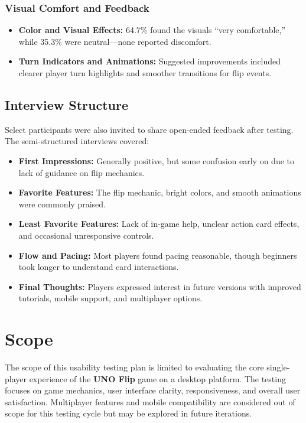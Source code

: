 \documentclass[12pt, titlepage]{article}
\begin{document}
\subsubsection{Visual Comfort and Feedback}
\begin{itemize}
    \item \textbf{Color and Visual Effects:} 64.7\% found the visuals “very comfortable,” while 35.3\% were neutral—none reported discomfort.
    \item \textbf{Turn Indicators and Animations:} Suggested improvements included clearer player turn highlights and smoother transitions for flip events.
\end{itemize}

\subsection{Interview Structure}
Select participants were also invited to share open-ended feedback after testing. The semi-structured interviews covered:

\begin{itemize}
    \item \textbf{First Impressions:} Generally positive, but some confusion early on due to lack of guidance on flip mechanics.
    \item \textbf{Favorite Features:} The flip mechanic, bright colors, and smooth animations were commonly praised.
    \item \textbf{Least Favorite Features:} Lack of in-game help, unclear action card effects, and occasional unresponsive controls.
    \item \textbf{Flow and Pacing:} Most players found pacing reasonable, though beginners took longer to understand card interactions.
    \item \textbf{Final Thoughts:} Players expressed interest in future versions with improved tutorials, mobile support, and multiplayer options.
\end{itemize}
\section{Scope}
The scope of this usability testing plan is limited to evaluating the core single-player experience of the \textbf{UNO Flip} game on a desktop platform. The testing focuses on game mechanics, user interface clarity, responsiveness, and overall user satisfaction. Multiplayer features and mobile compatibility are considered out of scope for this testing cycle but may be explored in future iterations.
\end{document}
